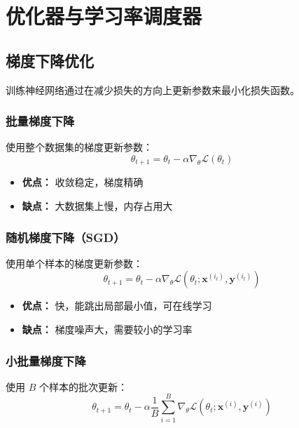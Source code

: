 \clearpage
\cleardoublepage

\chapter{优化器与学习率调度器}

\section{梯度下降优化}

训练神经网络通过在减少损失的方向上更新参数来最小化损失函数。

\subsection{批量梯度下降}

使用整个数据集的梯度更新参数：
\begin{equation}
\theta_{t+1} = \theta_t - \alpha \nabla_\theta \mathcal{L}(\theta_t)
\end{equation}

\begin{itemize}
    \item \textbf{优点：} 收敛稳定，梯度精确
    \item \textbf{缺点：} 大数据集上慢，内存占用大
\end{itemize}

\subsection{随机梯度下降（SGD）}

使用单个样本的梯度更新参数：
\begin{equation}
\theta_{t+1} = \theta_t - \alpha \nabla_\theta \mathcal{L}(\theta_t; \mathbf{x}^{(i_t)}, \mathbf{y}^{(i_t)})
\end{equation}

\begin{itemize}
    \item \textbf{优点：} 快，能跳出局部最小值，可在线学习
    \item \textbf{缺点：} 梯度噪声大，需要较小的学习率
\end{itemize}

\subsection{小批量梯度下降}

使用 $B$ 个样本的批次更新：
\begin{equation}
\theta_{t+1} = \theta_t - \alpha \frac{1}{B}\sum_{i=1}^{B}\nabla_\theta \mathcal{L}(\theta_t; \mathbf{x}^{(i)}, \mathbf{y}^{(i)})
\end{equation}

